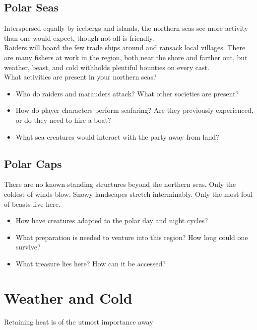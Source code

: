 \documentclass[notitlepage]{article}
\begin{document}
\begin{multicols}{2}
\subsection*{Polar Seas}

Interspersed equally by icebergs and islands, the northern seas see more activity than one would expect, though not all is friendly. \\

Raiders will board the few trade ships around and ransack local villages. There are many fishers at work in the region, both near the shore and farther out, but weather, beast, and cold withholds plentiful bounties on every cast. \\

What activities are present in your northern seas?

\begin{itemize}
\item Who do raiders and marauders attack? What other societies are present?
\item How do player characters perform seafaring? Are they previously experienced, or do they need to hire a boat?
\item What sea creatures would interact with the party away from land?
\end{itemize}

\subsection*{Polar Caps}

There are no known standing structures beyond the northern seas. Only the coldest of winds blow. Snowy landscapes stretch interminably. Only the most foul of beasts live here.

\begin{itemize}
\item How have creatures adapted to the polar day and night cycles?
\item What preparation is needed to venture into this region? How long could one survive?
\item What treasure lies here? How can it be accessed?
\end{itemize}

\section{Weather and Cold}

Retaining heat is of the utmost importance away \\


\end{multicols}
\end{document}
